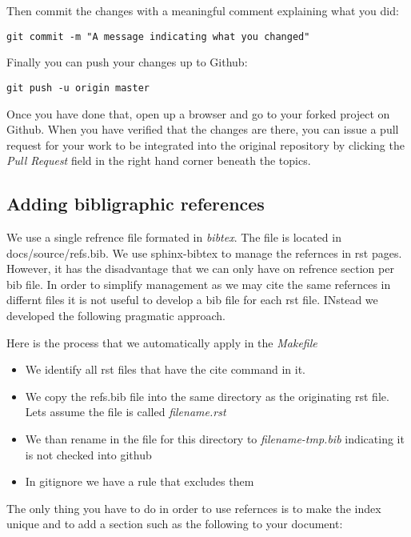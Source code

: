 Then commit the changes with a meaningful comment explaining what you
did:

\begin{verbatim}
git commit -m "A message indicating what you changed"
\end{verbatim}

Finally you can push your changes up to Github:

\begin{verbatim}
git push -u origin master
\end{verbatim}

Once you have done that, open up a browser and go to your forked project
on Github. When you have verified that the changes are there, you can
issue a pull request for your work to be integrated into the original
repository by clicking the \emph{Pull Request} field in the right hand
corner beneath the topics.

\subsection{Adding bibligraphic references}\label{adding-bibligraphic-references}

We use a single refrence file formated in \emph{bibtex}. The file is
located in docs/source/refs.bib. We use sphinx-bibtex to manage the
refernces in rst pages. However, it has the disadvantage that we can
only have on refrence section per bib file. In order to simplify
management as we may cite the same refernces in differnt files it is not
useful to develop a bib file for each rst file. INstead we developed the
following pragmatic approach.

Here is the process that we automatically apply in the \emph{Makefile}

\begin{itemize}

\item
  We identify all rst files that have the cite command in it.
\item
  We copy the refs.bib file into the same directory as the originating
  rst file. Lets assume the file is called \emph{filename.rst}
\item
  We than rename in the file for this directory to
  \emph{filename-tmp.bib} indicating it is not checked into github
\item
  In gitignore we have a rule that excludes them
\end{itemize}

The only thing you have to do in order to use refernces is to make the
index unique and to add a section such as the following to your
document:

